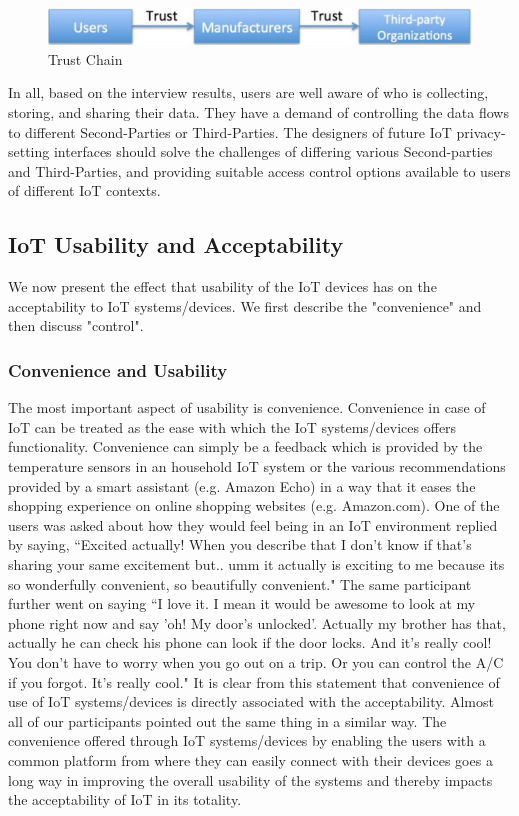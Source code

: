 \begin{figure}
	\centering
	\includegraphics[width=0.75\columnwidth]{figures/trustchain.pdf}
	\caption{Trust Chain}
	\label{fig:trustchain}
\end{figure}

In all, based on the interview results, users are well aware of who is collecting, storing, and sharing their data. They have a demand of controlling the data flows to different Second-Parties or Third-Parties. The designers of future IoT privacy-setting interfaces should solve the challenges of differing various Second-parties and Third-Parties, and providing suitable access control options available to users of different IoT contexts.

\subsection{IoT Usability and Acceptability}
We now present the effect that usability of the IoT devices has on the acceptability to IoT systems/devices. We first describe the "convenience" and then discuss "control".

\subsubsection{Convenience and Usability}
The most important aspect of usability is convenience. Convenience in case of IoT can be treated as the ease with which the IoT systems/devices offers functionality. Convenience can simply be a feedback which is provided by the temperature sensors in an household IoT system or the various recommendations provided by a smart assistant (e.g. Amazon Echo) in a way that it eases the shopping experience on online shopping websites (e.g. Amazon.com). One of the users was asked about how they would feel being in an IoT environment replied by saying, ``Excited actually! When you describe that I don't know if that's sharing your same excitement but.. umm it actually is exciting to me because its so wonderfully convenient, so beautifully convenient." The same participant further went on saying ``I love it. I mean it would be awesome to look at my phone right now and say 'oh! My door's unlocked'. Actually my brother has that, actually he can check his phone can look if the door locks. And it's really cool! You don't have to worry when you go out on a trip. Or you can control the A/C if you forgot. It's really cool."  It is clear from this statement that convenience of use of IoT systems/devices is directly associated with the acceptability. Almost all of our participants pointed out the same thing in a similar way. The convenience offered through IoT systems/devices by enabling the users with a common platform from where they can easily connect with their devices goes a long way in improving the overall usability of the systems and thereby impacts the acceptability of IoT in its totality. 

